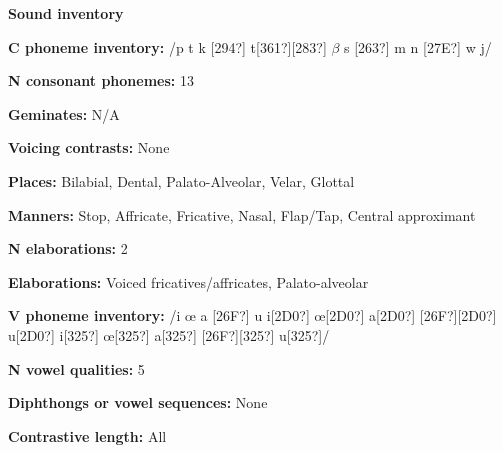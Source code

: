 \begin{styleBody}
\textbf{Sound inventory}
\end{styleBody}

\begin{styleBody}
\textbf{C phoneme inventory:} /p t k [294?] t[361?][283?] $\beta $ s [263?] m n [27E?] w j/
\end{styleBody}

\begin{styleBody}
\textbf{N consonant phonemes:} 13
\end{styleBody}

\begin{styleBody}
\textbf{Geminates:} N/A
\end{styleBody}

\begin{styleBody}
\textbf{Voicing contrasts:} None
\end{styleBody}

\begin{styleBody}
\textbf{Places:} Bilabial, Dental, Palato-Alveolar, Velar, Glottal
\end{styleBody}

\begin{styleBody}
\textbf{Manners:} Stop, Affricate, Fricative, Nasal, Flap/Tap, Central approximant
\end{styleBody}

\begin{styleBody}
\textbf{N elaborations:} 2
\end{styleBody}

\begin{styleBody}
\textbf{Elaborations:} Voiced fricatives/affricates, Palato-alveolar
\end{styleBody}

\begin{styleBody}
\textbf{V phoneme inventory:} /i œ a [26F?] u i[2D0?] œ[2D0?] a[2D0?] [26F?][2D0?] u[2D0?] i[325?] œ[325?] a[325?] [26F?][325?] u[325?]/
\end{styleBody}

\begin{styleBody}
\textbf{N vowel qualities:} 5
\end{styleBody}

\begin{styleBody}
\textbf{Diphthongs or vowel sequences:} None
\end{styleBody}

\begin{styleBody}
\textbf{Contrastive length:} All
\end{styleBody}

